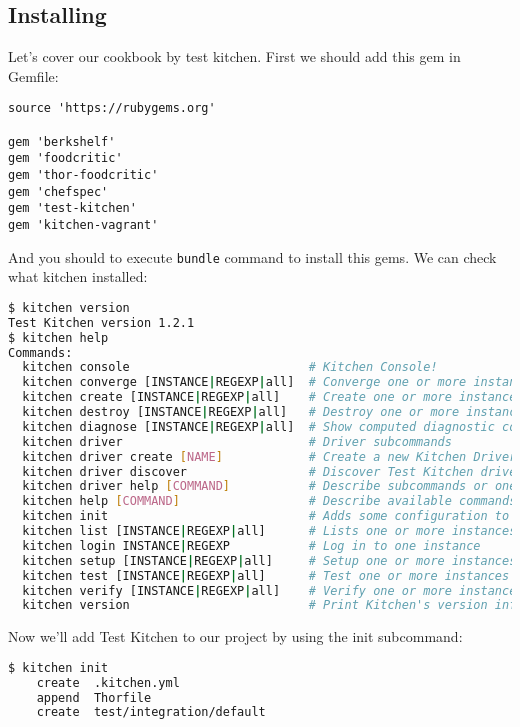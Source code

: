\subsection{Installing}

Let's cover our cookbook by test kitchen. First we should add this gem in Gemfile:

\begin{lstlisting}[label=lst:testing-test-kitchen1]
source 'https://rubygems.org'

gem 'berkshelf'
gem 'foodcritic'
gem 'thor-foodcritic'
gem 'chefspec'
gem 'test-kitchen'
gem 'kitchen-vagrant'
\end{lstlisting}

And you should to execute \lstinline!bundle! command to install this gems. We can check what kitchen installed:

\begin{lstlisting}[language=Bash,label=lst:testing-test-kitchen2]
$ kitchen version
Test Kitchen version 1.2.1
$ kitchen help
Commands:
  kitchen console                         # Kitchen Console!
  kitchen converge [INSTANCE|REGEXP|all]  # Converge one or more instances
  kitchen create [INSTANCE|REGEXP|all]    # Create one or more instances
  kitchen destroy [INSTANCE|REGEXP|all]   # Destroy one or more instances
  kitchen diagnose [INSTANCE|REGEXP|all]  # Show computed diagnostic configuration
  kitchen driver                          # Driver subcommands
  kitchen driver create [NAME]            # Create a new Kitchen Driver gem project
  kitchen driver discover                 # Discover Test Kitchen drivers published on RubyGems
  kitchen driver help [COMMAND]           # Describe subcommands or one specific subcommand
  kitchen help [COMMAND]                  # Describe available commands or one specific command
  kitchen init                            # Adds some configuration to your cookbook so Kitchen can rock
  kitchen list [INSTANCE|REGEXP|all]      # Lists one or more instances
  kitchen login INSTANCE|REGEXP           # Log in to one instance
  kitchen setup [INSTANCE|REGEXP|all]     # Setup one or more instances
  kitchen test [INSTANCE|REGEXP|all]      # Test one or more instances
  kitchen verify [INSTANCE|REGEXP|all]    # Verify one or more instances
  kitchen version                         # Print Kitchen's version information
\end{lstlisting}

Now we'll add Test Kitchen to our project by using the init subcommand:

\begin{lstlisting}[language=Bash,label=lst:testing-test-kitchen3]
$ kitchen init
    create  .kitchen.yml
    append  Thorfile
    create  test/integration/default
\end{lstlisting}

